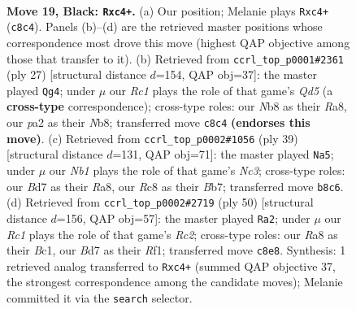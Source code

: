 \documentclass[11pt]{article}
\begin{document}
\clearpage

\begin{figure}[p]\centering
\begin{subfigure}{0.46\textwidth}\centering
\resizebox{\linewidth}{!}{%
\newchessgame
\chessboard[
  setfen={rnr3k1/pQ1b1ppp/4p3/8/2B1P2P/4nN2/PP1N2qR/R1K5 b - - 1 19},
  showmover=false,
  pgfstyle=straightmove, color=movearrow, markmove={c8-c4}
]}
\caption{}
\end{subfigure}\hfill
\begin{subfigure}{0.46\textwidth}\centering
\resizebox{\linewidth}{!}{%
\newchessgame
\chessboard[
  setfen={rn3rk1/pp3Npp/5n2/3p4/1b1q4/2N5/PP2QPPP/R1BR2K1 b - - 1 14},
  showmover=false,
  pgfstyle=straightmove, color=movearrow, markmove={d4-g4}
]}
\caption{}
\end{subfigure}
\\[4pt]
\begin{subfigure}{0.46\textwidth}\centering
\resizebox{\linewidth}{!}{%
\newchessgame
\chessboard[
  setfen={r2r2k1/1bQp1ppp/2n1p3/1Bp5/P3P3/2N4P/1q3PP1/2RR2K1 b - - 1 20},
  showmover=false,
  pgfstyle=straightmove, color=movearrow, markmove={c6-a5}
]}
\caption{}
\end{subfigure}\hfill
\begin{subfigure}{0.46\textwidth}\centering
\resizebox{\linewidth}{!}{%
\newchessgame
\chessboard[
  setfen={2rr2k1/p4pp1/1n5p/P3q3/1QpnPN2/5P2/2R3PP/2B2RK1 w - - 3 26},
  showmover=false,
  pgfstyle=straightmove, color=movearrow, markmove={c2-a2}
]}
\caption{}
\end{subfigure}
\caption{\textbf{Move 19, Black: \texttt{Rxc4+}.} (a) Our position; Melanie plays \texttt{Rxc4+} (\texttt{c8c4}). Panels (b)--(d) are the retrieved master positions whose correspondence most drove this move (highest QAP objective among those that transfer to it). (b) Retrieved from \texttt{ccrl\_top\_p0001\#2361} (ply 27) [structural distance $d$=154, QAP obj=37]: the master played \texttt{Qg4}; under $\mu$ our \emph{Rc1} plays the role of that game's \emph{Qd5} (a \textbf{cross-type} correspondence); cross-type roles: our \emph{N}b8 as their \emph{R}a8, our \emph{p}a2 as their \emph{N}b8; transferred move \texttt{c8c4} \textbf{(endorses this move)}. (c) Retrieved from \texttt{ccrl\_top\_p0002\#1056} (ply 39) [structural distance $d$=131, QAP obj=71]: the master played \texttt{Na5}; under $\mu$ our \emph{Nb1} plays the role of that game's \emph{Nc3}; cross-type roles: our \emph{B}d7 as their \emph{R}a8, our \emph{R}c8 as their \emph{B}b7; transferred move \texttt{b8c6}. (d) Retrieved from \texttt{ccrl\_top\_p0002\#2719} (ply 50) [structural distance $d$=156, QAP obj=57]: the master played \texttt{Ra2}; under $\mu$ our \emph{Rc1} plays the role of that game's \emph{Rc2}; cross-type roles: our \emph{R}a8 as their \emph{B}c1, our \emph{B}d7 as their \emph{R}f1; transferred move \texttt{c8e8}. Synthesis: 1 retrieved analog transferred to \texttt{Rxc4+} (summed QAP objective 37, the strongest correspondence among the candidate moves); Melanie committed it via the \texttt{search} selector.}
\label{fig:thought-m37}
\end{figure}
\end{document}
